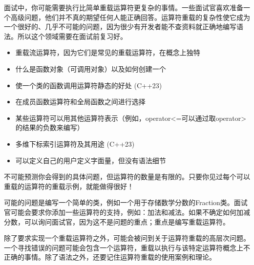 
面试中，你可能需要执行比简单重载运算符更复杂的事情。一些面试官喜欢准备一个高级问题，他们并不真的期望任何人能正确回答。运算符重载的复杂性使它成为一个很好的、几乎不可能的问题，因为很少有开发者能不查资料就正确地编写语法。所以这个领域需要在面试前复习好。


\begin{itemize}
\item
重载流运算符，因为它们是常见的重载运算符，在概念上独特

\item
什么是函数对象（可调用对象）以及如何创建一个

\item
使一个类的函数调用运算符静态的好处 (C++23)

\item
在成员函数运算符和全局函数之间进行选择

\item
某些运算符可以用其他运算符表示（例如，operator<=可以通过取operator>的结果的负数来编写）

\item
多维下标索引运算符及其用途 (C++23)

\item
可以定义自己的用户定义字面量，但没有语法细节
\end{itemize}


不可能预测你会得到的具体问题，但运算符的数量是有限的。只要你见过每个可以重载的运算符的重载示例，就能做得很好！

可能的问题是编写一个简单的类，例如一个用于存储数学分数的Fraction类。面试官可能会要求你添加一些运算符的支持，例如：加法和减法。如果不确定如何加减分数，可以询问面试官，因为这不是问题的重点；重点是编写重载运算符。

除了要求实现一个重载运算符之外，可能会被问到关于运算符重载的高层次问题。一个寻找错误的问题可能会包含一个运算符，重载以执行与该特定运算符概念上不正确的事情。除了语法之外，还要记住运算符重载的使用案例和理论。

